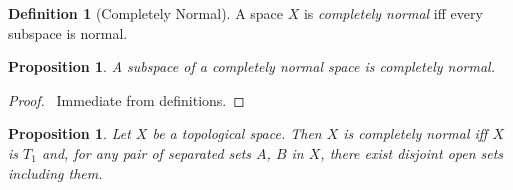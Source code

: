 \documentclass{report}
\let\qed\relax
\newtheorem{prop}[lm]{Proposition}
\theoremstyle{definition}
\newtheorem{df}[lm]{Definition}
\begin{document}
    \begin{df}[Completely Normal]
    A space $X$ is \emph{completely normal} iff every subspace is normal.
  \end{df}

      \begin{prop}
   A subspace of a completely normal space is completely normal.
  \end{prop}

  \begin{proof}
   \pf\ Immediate from definitions. \qed
  \end{proof}

    \begin{prop}
    \label{prop:topology:completely_normal:characterisation}
   Let $X$ be a topological space. Then $X$ is completely normal iff $X$ is
$T_1$ and, for any pair of separated sets $A$, $B$ in $X$, there exist disjoint
open sets including them.
  \end{prop}
\end{document}
